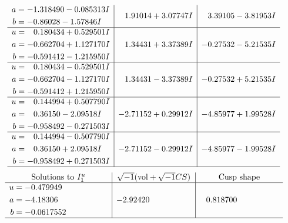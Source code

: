 \documentclass[1p]{elsarticle_modified}
\theoremstyle{definition}
\newcommand{\I}{\sqrt{-1}}
\begin{document}
$$\begin{array}{c|c|c}
\begin{aligned}
a &= -1.318490 - 0.085313 I \\
b &= -0.86028 - 1.57846 I\end{aligned}
 & \phantom{-}1.91014 + 3.07747 I & \phantom{-}3.39105 - 3.81953 I \\ \hline\begin{aligned}
u &= \phantom{-}0.180434 + 0.529501 I \\
a &= -0.662704 + 1.127170 I \\
b &= -0.591412 - 1.215950 I\end{aligned}
 & \phantom{-}1.34431 + 3.37389 I & -0.27532 - 5.21535 I \\ \hline\begin{aligned}
u &= \phantom{-}0.180434 - 0.529501 I \\
a &= -0.662704 - 1.127170 I \\
b &= -0.591412 + 1.215950 I\end{aligned}
 & \phantom{-}1.34431 - 3.37389 I & -0.27532 + 5.21535 I \\ \hline\begin{aligned}
u &= \phantom{-}0.144994 + 0.507790 I \\
a &= \phantom{-}0.36150 - 2.09518 I \\
b &= -0.958492 - 0.271503 I\end{aligned}
 & -2.71152 + 0.29912 I & -4.85977 + 1.99528 I \\ \hline\begin{aligned}
u &= \phantom{-}0.144994 - 0.507790 I \\
a &= \phantom{-}0.36150 + 2.09518 I \\
b &= -0.958492 + 0.271503 I\end{aligned}
 & -2.71152 - 0.29912 I & -4.85977 - 1.99528 I\\
 \hline 
 \end{array}$$\newpage$$\begin{array}{c|c|c}  
\text{Solutions to }I^u_{1}& \I (\text{vol} + \sqrt{-1}CS) & \text{Cusp shape}\\
 \hline 
\begin{aligned}
u &= -0.479949\phantom{ +0.000000I} \\
a &= -4.18306\phantom{ +0.000000I} \\
b &= -0.0617552\phantom{ +0.000000I}\end{aligned}
 & -2.92420\phantom{ +0.000000I} & \phantom{-}0.818700\phantom{ +0.000000I}\\
 \hline 
 \end{array}$$\newpage\newpage\renewcommand{\arraystretch}{1}
\end{document}
